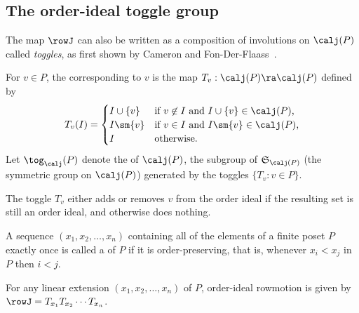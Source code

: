 \subsection{The order-ideal toggle group}
The map $\rowJ$ can also be written as a composition of involutions on $\calj (P)$ called
\emph{toggles}, as first shown by Cameron and Fon-Der-Flaass~\cite{cameronfonder}. 


\begin{defi}\label{def:comb-row}
For $v\in P$, the  corresponding to $v$ is the map
$T_v: \calj(P)\ra \calj(P)$
defined by
\[
T_v(I)=\begin{cases}
I\cup\{v\} &\text{if $v\not\in I$ and $I\cup\{v\}\in \calj(P)$,}\\
I\sm\{v\} &\text{if $v\in I$ and $I\sm\{v\}\in \calj(P)$,}\\
I &\text{otherwise.}
\end{cases}
\]
Let $\tog_\calj(P)$ denote the  of $\calj(P)$, \ie the subgroup of
$\mathfrak{S}_{\calj (P)}$ (the symmetric group on $\calj (P)$) generated by the toggles $\{T_v : v\in P\}$.
\end{defi}

The toggle $T_v$ either adds or removes $v$ from the order ideal if the resulting set is still an order ideal, and otherwise does nothing.

\begin{defi}[{\cite[\S~3.5]{ec1ed2}}]
A sequence $(x_1,x_2,\dots,x_n)$ containing all of the elements of a finite poset $P$ exactly once is called a  of $P$ if it is order-preserving, that is, whenever $x_i<x_j$ in $P$ then $i<j$.
\end{defi}

\begin{prop}\label{prop:row-toggles}
For any linear extension $(x_1,x_2,\dots,x_n)$ of $P$, order-ideal rowmotion is given
by $\rowJ = T_{x_1} T_{x_2} \cdots T_{x_n}$.
\end{prop}

